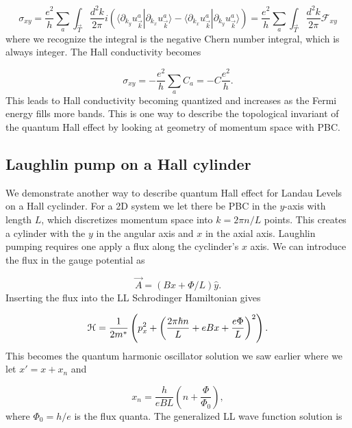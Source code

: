 \begin{equation}
  \sigma_{xy} = \dfrac{e^2}{h} \sum_{a} \int_{\vec{T}} \dfrac{d^2k}{2\pi} i\left(\langle \partial_{k_y} u_{\vec{k}}^a | \partial_{k_x} u_{\vec{k}}^a \rangle - \langle \partial_{k_x} u_{\vec{k}}^a | \partial_{k_y} u_{\vec{k}}^a \rangle \right) = \dfrac{e^2}{h} \sum_{a} \int_{\vec{T}} \dfrac{d^2k}{2\pi} \mathcal{F}_{xy}
\end{equation}
where we recognize the integral is the negative Chern number integral, which is always integer.
The Hall conductivity becomes

\begin{equation}
  \sigma_{xy} = -\dfrac{e^2}{h} \sum_a C_a = -C \dfrac{e^2}{h}.
\end{equation}
This leads to Hall conductivity becoming quantized and increases as the Fermi energy fills more bands.
This is one way to describe the topological invariant of the quantum Hall effect by looking at geometry of momentum space with PBC.

\subsection{Laughlin pump on a Hall cylinder}
We demonstrate another way to describe quantum Hall effect for Landau Levels on a Hall cyclinder.
For a 2D system we let there be PBC in the $y$-axis with length $L$, which discretizes momentum space into $k = 2\pi n/ L$ points.
This creates a cylinder with the $y$ in the angular axis and $x$ in the axial axis.
Laughlin pumping requires one apply a flux along the cyclinder's $x$ axis.
We can introduce the flux in the gauge potential as

\begin{equation}
  \vec{A} = (Bx + \Phi/L)\hat{y}.
\end{equation}
Inserting the flux into the LL Schrodinger Hamiltonian gives

\begin{equation}
  \mathcal{H} = \dfrac{1}{2m^*} \left( p_x^2 + {\left(\dfrac{2\pi \hbar n}{L} + eBx + \dfrac{e\Phi}{L} \right)}^2\right).
\end{equation}
This becomes the quantum harmonic oscillator solution we saw earlier where we let $x' = x + x_n$ and

\begin{equation} \label{eq:xCM}
  x_n = \dfrac{h}{eBL} \left(n + \dfrac{\Phi}{\Phi_0} \right),
\end{equation}
where $\Phi_0 = h/e$ is the flux quanta.
The generalized LL wave function solution is

